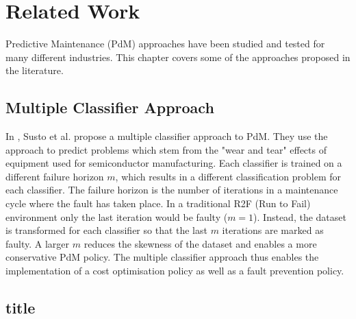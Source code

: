 \chapter{Related Work}
\label{cha:related-work}

Predictive Maintenance (PdM) approaches have been studied and tested for many different industries.
This chapter covers some of the approaches proposed in the literature.

\section{Multiple Classifier Approach}


In \cite{Susto2015}, Susto et al. propose a multiple classifier approach to PdM.
They use the approach to predict problems which stem from the "wear and tear" effects of equipment used for semiconductor manufacturing.
Each classifier is trained on a different failure horizon $m$, which results in a different classification problem for each classifier.
The failure horizon is the number of iterations in a maintenance cycle where the fault has taken place.
In a traditional R2F (Run to Fail) environment only the last iteration would be faulty ($m=1$).
Instead, the dataset is transformed for each classifier so that the last $m$ iterations are marked as faulty.
A larger $m$ reduces the skewness of the dataset and enables a more conservative PdM policy.
The multiple classifier approach thus enables the implementation of a cost optimisation policy as well as a fault prevention policy.

\section{title}






